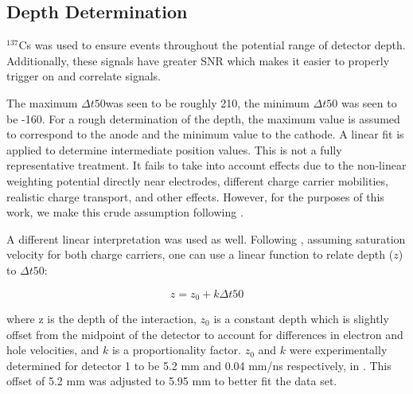 \subsection*{Depth Determination}

${}^{137}$Cs was used to ensure events throughout the potential range of detector depth. Additionally, these signals have greater SNR which makes it easier to properly trigger on and correlate signals.

The maximum $\Delta t50$was seen to be roughly 210, the minimum $\Delta t50$ was seen to be -160. For a rough determination of the depth, the maximum value is assumed to correspond to the anode and the minimum value to the cathode. A linear fit is applied to determine intermediate position values. This is not a fully representative treatment. It fails to take into account effects due to the non-linear weighting potential directly near electrodes, different charge carrier mobilities, realistic charge transport, and other effects. However, for the purposes of this work, we make this crude assumption following \cite{amman}.

A different linear interpretation was used as well. Following \cite{cci21}, assuming saturation velocity for both charge carriers, one can use a linear function to relate depth ($z$) to $\Delta t50$:

\begin{equation}
z = z_0 + k \Delta t50
\end{equation}

where z is the depth of the interaction, $z_0$ is a constant depth which is slightly offset from the midpoint of the detector to account for differences in electron and hole velocities, and $k$ is a proportionality factor. $z_0$ and $k$ were experimentally determined for detector 1 to be 5.2 mm and 0.04 mm/ns respectively, in \cite{cci21}. This offset of 5.2 mm was adjusted to 5.95 mm to better fit the data set.
